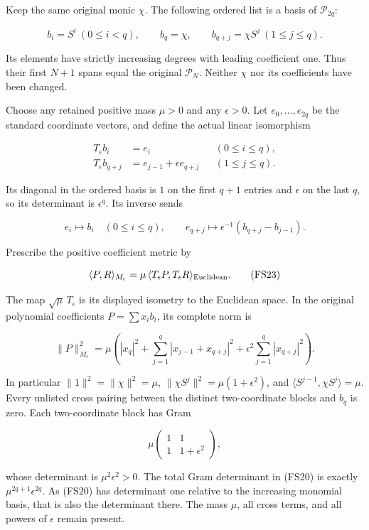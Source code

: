\documentclass{article}
\begin{document}
Keep the same original monic \(\chi\). The following ordered list is a basis of \(\mathcal P_{2q}\):

\[
b_i=S^i\ (0\le i<q),\qquad
b_q=\chi,\qquad
b_{q+j}=\chi S^j\ (1\le j\le q).
\tag{FS20}
\]

Its elements have strictly increasing degrees with leading coefficient one. Thus their first \(N+1\) spans equal the original \(\mathcal P_N\). Neither \(\chi\) nor its coefficients have been changed.

Choose any retained positive mass \(\mu>0\) and any \(\epsilon>0\). Let \(e_0,\ldots,e_{2q}\) be the standard coordinate vectors, and define the actual linear isomorphism

\[
\begin{aligned}
T_\epsilon b_i&=e_i &&(0\le i\le q),\\
T_\epsilon b_{q+j}&=e_{j-1}+\epsilon e_{q+j}
&&(1\le j\le q).
\end{aligned}
\tag{FS21}
\]

Its diagonal in the ordered basis is \(1\) on the first \(q+1\) entries and \(\epsilon\) on the last \(q\), so its determinant is \(\epsilon^q\). Its inverse sends

\[
e_i\longmapsto b_i\quad(0\le i\le q),\qquad
e_{q+j}\longmapsto\epsilon^{-1}(b_{q+j}-b_{j-1}).
\tag{FS22}
\]

Prescribe the positive coefficient metric by

\[
\langle P,R\rangle_{M_\epsilon}
=\mu\,\langle T_\epsilon P,T_\epsilon R\rangle_{\rm Euclidean}.
\tag{FS23}
\]

The map \(\sqrt\mu\,T_\epsilon\) is its displayed isometry to the Euclidean space. In the original polynomial coefficients \(P=\sum x_i b_i\), its complete norm is

\[
\boxed{
\|P\|_{M_\epsilon}^2
=\mu\left(|x_q|^2+
\sum_{j=1}^q|x_{j-1}+x_{q+j}|^2+
\epsilon^2\sum_{j=1}^q|x_{q+j}|^2\right).
}
\tag{FS24}
\]

In particular \(\|1\|^2=\|\chi\|^2=\mu\), \(\|\chi S^j\|^2=\mu(1+\epsilon^2)\), and \(\langle S^{j-1},\chi S^j\rangle=\mu\). Every unlisted cross pairing between the distinct two-coordinate blocks and \(b_q\) is zero. Each two-coordinate block has Gram

\[
\mu\begin{pmatrix}1&1\\1&1+\epsilon^2\end{pmatrix},
\tag{FS25}
\]

whose determinant is \(\mu^2\epsilon^2>0\). The total Gram determinant in (FS20) is exactly \(\mu^{2q+1}\epsilon^{2q}\). As (FS20) has determinant one relative to the increasing monomial basis, that is also the determinant there. The mass \(\mu\), all cross terms, and all powers of \(\epsilon\) remain present.
\end{document}
